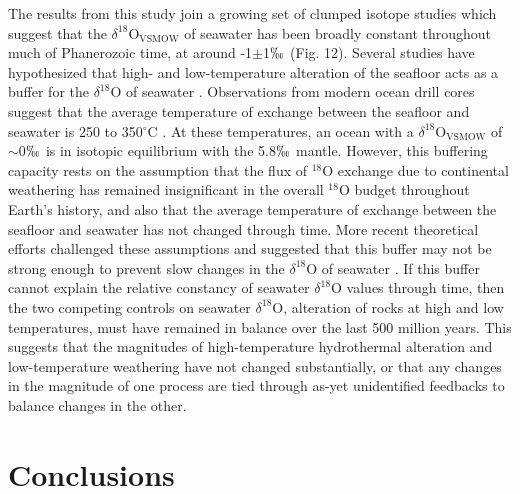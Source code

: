 \documentclass[preprint, authoryear]{elsarticle}
\begin{document}
The results from this study join a growing set of clumped isotope studies \citep{Came2007, Dennis2013, Finnegan2011} which suggest that the $\delta^{18}$O$_{\text{VSMOW}}$ of seawater has been broadly constant throughout much of Phanerozoic time, at around -1$\pm$1$\permil$ (Fig. 12). Several studies have hypothesized that high- and low-temperature alteration of the seafloor acts as a buffer for the $\delta^{18}$O of seawater \citep{Gregory1981, Gregory1991, Muehlenbachs1976, Muehlenbachs1998}. Observations from modern ocean drill cores suggest that the average temperature of exchange between the seafloor and seawater is 250 to 350$^{\circ}$C \citep{Muehlenbachs1998}. At these temperatures, an ocean with a $\delta^{18}$O$_{\text{VSMOW}}$ of $\sim$0$\permil$ is in isotopic equilibrium with the 5.8$\permil$ mantle. However, this buffering capacity rests on the assumption that the flux of $^{18}$O exchange due to continental weathering has remained insignificant in the overall $^{18}$O budget throughout Earth’s history, and also that the average temperature of exchange between the seafloor and seawater has not changed through time. More recent theoretical efforts challenged these assumptions and suggested that this buffer may not be strong enough to prevent slow changes in the $\delta^{18}$O of seawater \citep{Jaffres2007}. If this buffer cannot explain the relative constancy of seawater $\delta^{18}$O values through time, then the two competing controls on seawater $\delta^{18}$O, alteration of rocks at high and low temperatures, must have remained in balance over the last 500 million years. This suggests that the magnitudes of high-temperature hydrothermal alteration and low-temperature weathering have not changed substantially, or that any changes in the magnitude of one process are tied through as-yet unidentified feedbacks to balance changes in the other. 

\section{Conclusions}
\end{document}
